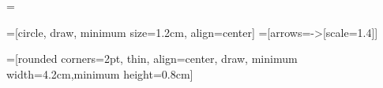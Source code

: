 \usepackage{mathtools}
\usepackage{amsfonts}
\usepackage{amsthm}
\usepackage{amssymb}
\usepackage{stmaryrd}

\usepackage{mathpartir}

\usepackage{array}
\usepackage{tabu}

\usepackage{dashbox}

\usepackage{pftools}

\usepackage{xcolor}  %

\usepackage{graphicx}
\usepackage{tikz}
\usepackage{scalerel}

\usepackage{rotating}
\usepackage{xparse}
\usepackage{xstring}
\usepackage{semantic}
\usepackage{csquotes}

\usepackage{hyperref}


\extrarowheight=\jot	%


\usetikzlibrary{shapes}
\usetikzlibrary{arrows}
\usetikzlibrary{calc}
\usetikzlibrary{arrows.meta}
=[circle, draw, minimum size=1.2cm, align=center]
=[arrows={->[scale=1.4]}]

=[rounded corners=2pt, thin, align=center, draw, minimum width=4.2cm,minimum height=0.8cm]


